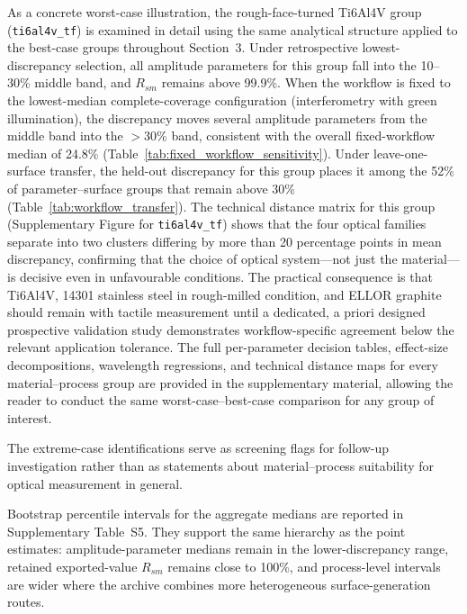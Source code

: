 \documentclass{article}
\begin{document}
As a concrete worst-case illustration, the rough-face-turned Ti6Al4V group (\texttt{ti6al4v\_tf}) is examined in detail using the same analytical structure applied to the best-case groups throughout Section~3. Under retrospective lowest-discrepancy selection, all amplitude parameters for this group fall into the 10--30\% middle band, and $R_{sm}$ remains above 99.9\%. When the workflow is fixed to the lowest-median complete-coverage configuration (interferometry with green illumination), the discrepancy moves several amplitude parameters from the middle band into the $>$30\% band, consistent with the overall fixed-workflow median of 24.8\% (Table~\ref{tab:fixed_workflow_sensitivity}). Under leave-one-surface transfer, the held-out discrepancy for this group places it among the 52\% of parameter--surface groups that remain above 30\% (Table~\ref{tab:workflow_transfer}). The technical distance matrix for this group (Supplementary Figure for \texttt{ti6al4v\_tf}) shows that the four optical families separate into two clusters differing by more than 20 percentage points in mean discrepancy, confirming that the choice of optical system---not just the material---is decisive even in unfavourable conditions. The practical consequence is that Ti6Al4V, 14301 stainless steel in rough-milled condition, and ELLOR graphite should remain with tactile measurement until a dedicated, a priori designed prospective validation study demonstrates workflow-specific agreement below the relevant application tolerance. The full per-parameter decision tables, effect-size decompositions, wavelength regressions, and technical distance maps for every material--process group are provided in the supplementary material, allowing the reader to conduct the same worst-case--best-case comparison for any group of interest.

The extreme-case identifications serve as screening flags for follow-up investigation rather than as statements about material--process suitability for optical measurement in general.

Bootstrap percentile intervals for the aggregate medians are reported in Supplementary Table~S5. They support the same hierarchy as the point estimates: amplitude-parameter medians remain in the lower-discrepancy range, retained exported-value $R_{sm}$ remains close to 100\%, and process-level intervals are wider where the archive combines more heterogeneous surface-generation routes.



\end{document}
